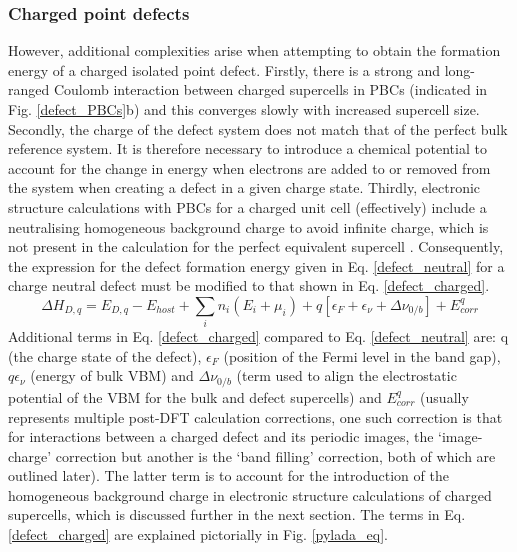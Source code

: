 \documentclass[11pt, twoside]{report}
\begin{document}
\subsubsection{Charged point defects}
However, additional complexities arise when attempting to obtain the formation energy of a charged isolated point defect. Firstly, there is a strong and long-ranged Coulomb interaction between charged supercells in PBCs (indicated in Fig. \ref{defect_PBCs}b) and this converges slowly with increased supercell size.
Secondly, the charge of the defect system does not match that of the perfect bulk reference system. It is therefore necessary to introduce a chemical potential to account for the change in energy when electrons are added to or removed from the system when creating a defect in a given charge state.
Thirdly, electronic structure calculations with PBCs for a charged unit cell (effectively) include a neutralising homogeneous background charge to avoid infinite charge, which is not present in the calculation for the perfect equivalent supercell \cite{freysoldt_rev}. Consequently, the expression for the defect formation energy given in Eq. \ref{defect_neutral} for a charge neutral defect must be modified to that shown in Eq. \ref{defect_charged}.
\begin{equation}\label{defect_charged}
\Delta H_{D,q} = E_{D,q} - E_{host} + \sum_i n_i (E_i + \mu_i) + q[\epsilon_F + \epsilon_{\nu} + \Delta \nu_{0/b}] + E^q_{corr}
\end{equation}
Additional terms in Eq. \ref{defect_charged} compared to Eq. \ref{defect_neutral} are: q (the charge state of the defect), $\epsilon_F$ (position of the Fermi level in the band gap),  $q \epsilon_{\nu}$ (energy of bulk VBM) and $\Delta \nu_{0/b}$ (term used to align the electrostatic potential of the VBM for the bulk and defect supercells) and $E^q_{corr}$ (usually represents multiple post-DFT calculation corrections, one such correction is that for interactions between a charged defect and its periodic images, the `image-charge' correction but another is the `band filling' correction, both of which are outlined later). The latter term is to account for the introduction of the homogeneous background charge in electronic structure calculations of charged supercells, which is discussed further in the next section. The terms in Eq. \ref{defect_charged} are explained pictorially in Fig. \ref{pylada_eq}.
\end{document}
